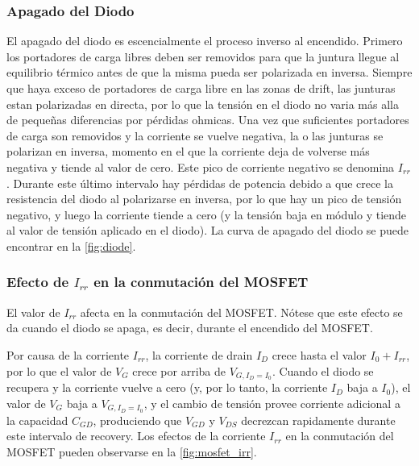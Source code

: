 \documentclass[e4_tp1_main.tex]{subfiles}
\begin{document}
\subsubsection{Apagado del Diodo}
El apagado del diodo es escencialmente el proceso inverso al encendido. Primero los portadores de carga libres deben ser removidos para que la juntura llegue al equilibrio térmico antes de que la misma pueda ser polarizada en inversa. Siempre que haya exceso de portadores de carga libre en las zonas de drift, las junturas estan polarizadas en directa, por lo que la tensión en el diodo no varia más alla de pequeñas diferencias por pérdidas ohmicas. Una vez que suficientes portadores de carga son removidos y la corriente se vuelve negativa, la o las junturas se polarizan en inversa, momento en el que la corriente deja de volverse más negativa y tiende al valor de cero. Este pico de corriente negativo se denomina $I_{rr}$. Durante este último intervalo hay pérdidas de potencia debido a que crece la resistencia del diodo al polarizarse en inversa, por lo que hay un pico de tensión negativo, y luego la corriente tiende a cero (y la tensión baja en módulo y tiende al valor de tensión aplicado en el diodo). La curva de apagado del diodo se puede encontrar en la \autoref{fig:diode}.

\subsubsection{Efecto de $I_{rr}$ en la conmutación del MOSFET}

El valor de $I_{rr}$ afecta en la conmutación del MOSFET. Nótese que este efecto se da cuando el diodo se apaga, es decir, durante el encendido del MOSFET.

Por causa de la corriente $I_{rr}$, la corriente de drain $I_D$ crece hasta el valor $I_0+I_{rr}$, por lo que el valor de $V_{G}$ crece por arriba de $V_{G,I_D=I_0}$. Cuando el diodo se recupera y la corriente vuelve a cero (y, por lo tanto, la corriente $I_D$ baja a $I_0$), el valor de $V_G$ baja a $V_{G,I_D=I_0}$, y el cambio de tensión provee corriente adicional a la capacidad $C_{GD}$, produciendo que $V_{GD}$ y $V_{DS}$ decrezcan rapidamente durante este intervalo de recovery. Los efectos de la corriente $I_{rr}$ en la conmutación del MOSFET pueden observarse en la \autoref{fig:mosfet_irr}.
\end{document}
